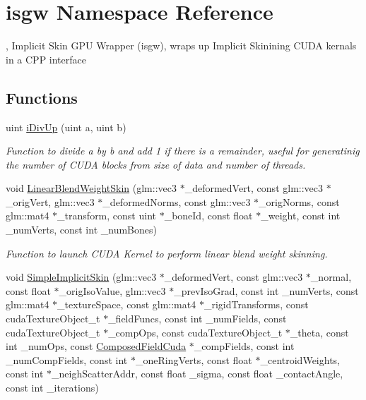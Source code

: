\hypertarget{namespaceisgw}{}\section{isgw Namespace Reference}
\label{namespaceisgw}


, Implicit Skin G\+PU Wrapper (isgw), wraps up Implicit Skinining C\+U\+DA kernals in a C\+PP interface  


\subsection*{Functions}
\begin{DoxyCompactItemize}
\item 
uint \hyperlink{namespaceisgw_a2e4ac5beae0fbbe25749f7ba5a85805e}{i\+Div\+Up} (uint a, uint b)
\begin{DoxyCompactList}\small\item\em Function to divide a by b and add 1 if there is a remainder, useful for generatinig the number of C\+U\+DA blocks from size of data and number of threads. \end{DoxyCompactList}\item 
void \hyperlink{namespaceisgw_a9f9396298bae07477376b8fa48795327}{Linear\+Blend\+Weight\+Skin} (glm\+::vec3 $\ast$\+\_\+deformed\+Vert, const glm\+::vec3 $\ast$\+\_\+orig\+Vert, glm\+::vec3 $\ast$\+\_\+deformed\+Norms, const glm\+::vec3 $\ast$\+\_\+orig\+Norms, const glm\+::mat4 $\ast$\+\_\+transform, const uint $\ast$\+\_\+bone\+Id, const float $\ast$\+\_\+weight, const int \+\_\+num\+Verts, const int \+\_\+num\+Bones)
\begin{DoxyCompactList}\small\item\em Function to launch C\+U\+DA Kernel to perform linear blend weight skinning. \end{DoxyCompactList}\item 
void \hyperlink{namespaceisgw_acd11ec618e357fefdc8e530211339cdf}{Simple\+Implicit\+Skin} (glm\+::vec3 $\ast$\+\_\+deformed\+Vert, const glm\+::vec3 $\ast$\+\_\+normal, const float $\ast$\+\_\+orig\+Iso\+Value, glm\+::vec3 $\ast$\+\_\+prev\+Iso\+Grad, const int \+\_\+num\+Verts, const glm\+::mat4 $\ast$\+\_\+texture\+Space, const glm\+::mat4 $\ast$\+\_\+rigid\+Transforms, const cuda\+Texture\+Object\+\_\+t $\ast$\+\_\+field\+Funcs, const int \+\_\+num\+Fields, const cuda\+Texture\+Object\+\_\+t $\ast$\+\_\+comp\+Ops, const cuda\+Texture\+Object\+\_\+t $\ast$\+\_\+theta, const int \+\_\+num\+Ops, const \hyperlink{classComposedFieldCuda}{Composed\+Field\+Cuda} $\ast$\+\_\+comp\+Fields, const int \+\_\+num\+Comp\+Fields, const int $\ast$\+\_\+one\+Ring\+Verts, const float $\ast$\+\_\+centroid\+Weights, const int $\ast$\+\_\+neigh\+Scatter\+Addr, const float \+\_\+sigma, const float \+\_\+contact\+Angle, const int \+\_\+iterations)\hypertarget{namespaceisgw_acd11ec618e357fefdc8e530211339cdf}{}\label{namespaceisgw_acd11ec618e357fefdc8e530211339cdf}


\end{DoxyCompactItemize}
